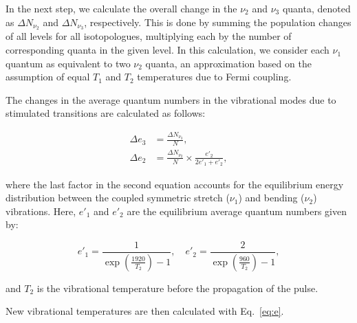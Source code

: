 In the next step, we calculate the overall change in the $\nu_2$ and $\nu_3$ quanta, denoted as $\Delta N_{\nu_2}$ and $\Delta N_{\nu_3}$, respectively. This is done by summing the population changes of all levels for all isotopologues, multiplying each by the number of corresponding quanta in the given level. In this calculation, we consider each $\nu_1$ quantum as equivalent to two $\nu_2$ quanta, an approximation based on the assumption of equal $T_1$ and $T_2$ temperatures due to Fermi coupling.

The changes in the average quantum numbers in the vibrational modes due to stimulated transitions are calculated as follows:

\begin{equation}\label{eq:Deltae}
\begin{aligned}
\Delta e_3 &= \frac{\Delta N_{\nu_3}}{N}, \\
\Delta e_2 &= \frac{\Delta N_{\nu_2}}{N} \times \frac{e'_2}{2 e'_1 + e'_2},
\end{aligned}
\end{equation}

where the last factor in the second equation accounts for the equilibrium energy distribution between the coupled symmetric stretch ($\nu_1$) and bending ($\nu_2$) vibrations. Here, $e'_1$ and $e'_2$ are the equilibrium average quantum numbers given by:

\[
e'_1 = \frac{1}{\exp\left( \frac{1920}{T_2} \right) - 1}, \quad e'_2 = \frac{2}{\exp\left( \frac{960}{T_2} \right) - 1},
\]

and $T_2$ is the vibrational temperature before the propagation of the pulse.

New vibrational temperatures are then calculated with Eq.~\ref{eq:e}.

